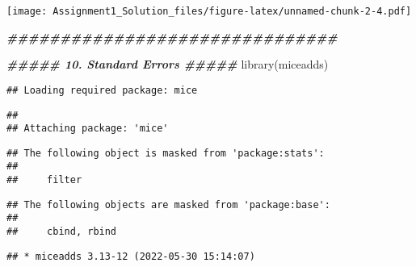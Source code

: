 \documentclass[
]{article}
\newenvironment{Shaded}{\begin{snugshade}}{\end{snugshade}}
\newcommand{\DocumentationTok}[1]{\textcolor[rgb]{0.56,0.35,0.01}{\textbf{\textit{#1}}}}
\newcommand{\FunctionTok}[1]{\textcolor[rgb]{0.00,0.00,0.00}{#1}}
\newcommand{\NormalTok}[1]{#1}
\begin{document}
\texttt{[image: Assignment1\_Solution\_files/figure-latex/unnamed-chunk-2-4.pdf]}

\begin{Shaded}
\begin{Highlighting}[]
\DocumentationTok{\#\#\#\#\#\#\#\#\#\#\#\#\#\#\#\#\#\#\#\#\#\#\#\#\#\#\#\#\#\#\#}


\DocumentationTok{\#\#\#\#\# 10. Standard Errors \#\#\#\#\#}
\FunctionTok{library}\NormalTok{(miceadds)}
\end{Highlighting}
\end{Shaded}

\begin{verbatim}
## Loading required package: mice
\end{verbatim}

\begin{verbatim}
## 
## Attaching package: 'mice'
\end{verbatim}

\begin{verbatim}
## The following object is masked from 'package:stats':
## 
##     filter
\end{verbatim}

\begin{verbatim}
## The following objects are masked from 'package:base':
## 
##     cbind, rbind
\end{verbatim}

\begin{verbatim}
## * miceadds 3.13-12 (2022-05-30 15:14:07)
\end{verbatim}
\end{document}
